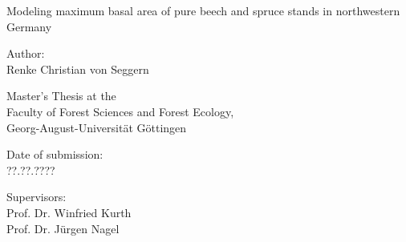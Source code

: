 \begin{titlepage}

\begin{center}

\vspace*{5cm}

{\LARGE Modeling maximum basal area of pure beech and spruce stands in northwestern Germany \\}

\vspace{2cm}

{\large Author: \\ Renke Christian von Seggern \par}

\vspace{2cm}

{\normalsize Master’s Thesis at the \\
  Faculty of Forest Sciences and Forest Ecology, \\
  Georg-August-Universität Göttingen}

\vspace{0.5cm}

{\normalsize Date of submission: \\ ??.??.???? \par}

\vspace{0.5cm}

{\normalsize Supervisors: \\ Prof. Dr. Winfried Kurth \\ Prof. Dr. Jürgen Nagel \par}

\end{center}

\end{titlepage}

